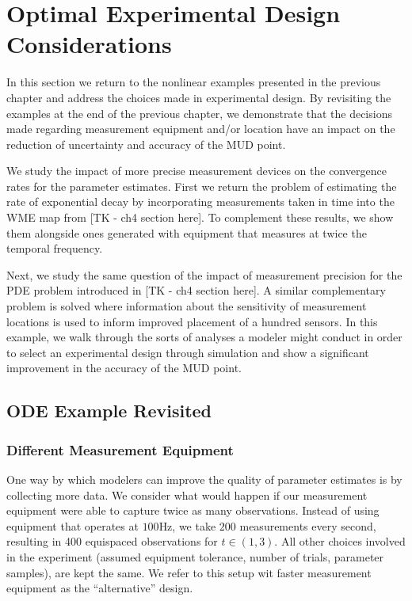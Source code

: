 \section{Optimal Experimental Design Considerations}

In this section we return to the nonlinear examples presented in the previous chapter and address the choices made in experimental design.
By revisiting the examples at the end of the previous chapter, we demonstrate that the decisions made regarding measurement equipment and/or location have an impact on the reduction of uncertainty and accuracy of the MUD point.

We study the impact of more precise measurement devices on the convergence rates for the parameter estimates.
First we return the problem of estimating the rate of exponential decay by incorporating measurements taken in time into the WME map from [TK - ch4 section here].
To complement these results, we show them alongside ones generated with equipment that measures at twice the temporal frequency.

Next, we study the same question of the impact of measurement precision for the PDE problem introduced in [TK - ch4 section here].
A similar complementary problem is solved where information about the sensitivity of measurement locations is used to inform improved placement of a hundred sensors.
In this example, we walk through the sorts of analyses a modeler might conduct in order to select an experimental design through simulation and show a significant improvement in the accuracy of the MUD point.


\subsection{ODE Example Revisited}
\FloatBarrier
\subsubsection{Different Measurement Equipment}

One way by which modelers can improve the quality of parameter estimates is by collecting more data.
We consider what would happen if our measurement equipment were able to capture twice as many observations.
Instead of using equipment that operates at $100$Hz, we take $200$ measurements every second, resulting in 400 equispaced observations for $t \in (1,3)$.
All other choices involved in the experiment (assumed equipment tolerance, number of trials, parameter samples), are kept the same.
We refer to this setup wit faster measurement equipment as the ``alternative'' design.


